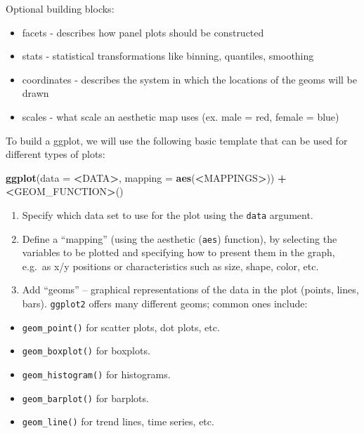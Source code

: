 \documentclass[
]{book}
\newenvironment{Shaded}{\begin{snugshade}}{\end{snugshade}}
\newcommand{\DataTypeTok}[1]{\textcolor[rgb]{0.13,0.29,0.53}{#1}}
\newcommand{\ErrorTok}[1]{\textcolor[rgb]{0.64,0.00,0.00}{\textbf{#1}}}
\newcommand{\KeywordTok}[1]{\textcolor[rgb]{0.13,0.29,0.53}{\textbf{#1}}}
\newcommand{\NormalTok}[1]{#1}
\newcommand{\OperatorTok}[1]{\textcolor[rgb]{0.81,0.36,0.00}{\textbf{#1}}}
\newcommand{\StringTok}[1]{\textcolor[rgb]{0.31,0.60,0.02}{#1}}
\providecommand{\tightlist}{%
  \setlength{\itemsep}{0pt}\setlength{\parskip}{0pt}}
\begin{document}
Optional building blocks:

\begin{itemize}
\tightlist
\item
  facets - describes how panel plots should be constructed
\item
  stats - statistical transformations like binning, quantiles, smoothing
\item
  coordinates - describes the system in which the locations of the geoms will be drawn
\item
  scales - what scale an aesthetic map uses (ex. male = red, female = blue)
\end{itemize}

To build a ggplot, we will use the following basic template that can be used for different types of plots:

\begin{Shaded}
\begin{Highlighting}[]
\KeywordTok{ggplot}\NormalTok{(}\DataTypeTok{data =} \OperatorTok{<}\NormalTok{DATA}\OperatorTok{>}\NormalTok{, }\DataTypeTok{mapping =} \KeywordTok{aes}\NormalTok{(}\OperatorTok{<}\NormalTok{MAPPINGS}\OperatorTok{>}\NormalTok{)) }\OperatorTok{+}\StringTok{ }\ErrorTok{<}\NormalTok{GEOM_FUNCTION}\OperatorTok{>}\NormalTok{()}
\end{Highlighting}
\end{Shaded}

\begin{enumerate}
\def\labelenumi{\arabic{enumi}.}
\item
  Specify which data set to use for the plot using the \texttt{data} argument.
\item
  Define a ``mapping'' (using the aesthetic (\texttt{aes}) function), by selecting the variables to be plotted and specifying how to present them in the graph, e.g.~as x/y positions or characteristics such as size, shape, color, etc.
\item
  Add ``geoms'' -- graphical representations of the data in the plot (points, lines, bars). \texttt{ggplot2} offers many different geoms; common ones include:
\end{enumerate}

\begin{itemize}
\tightlist
\item
  \texttt{geom\_point()} for scatter plots, dot plots, etc.
\item
  \texttt{geom\_boxplot()} for boxplots.
\item
  \texttt{geom\_histogram()} for histograms.
\item
  \texttt{geom\_barplot()} for barplots.
\item
  \texttt{geom\_line()} for trend lines, time series, etc.
\end{itemize}
\end{document}
